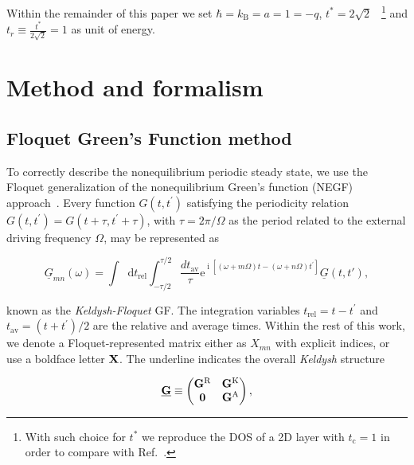 \documentclass[aps,prb,groupedaddress,showpacs,twocolumn,superscriptaddress,10pt]{revtex4-2}
\newcommand{\ee}{\mathrm{e}}  %
\DeclareMathOperator*{\ii}{i} %
\newcommand*\dd{\mathop{}\!\mathrm{d}}
\begin{document}
Within the remainder of this paper we set $\hbar = k_{\text{B}} = a = 1 = -q$, $t^{\ast}=2\sqrt{2}$ ~\footnote{With such choice for $t^{\ast}$ we reproduce the DOS of a 2D layer with $t_{\text{c}}=1$  in order to compare with Ref.~\cite{so.do.18}.} and $t_r \equiv \frac{t^{\ast}}{2\sqrt{2}}=1$ as unit of energy. 

  

\section{Method and formalism}    
\label{sec:Method_formalism}  

\subsection{Floquet Green's Function method}   
\label{sec:GFs_Dyson_Floquet}

To correctly describe the nonequilibrium periodic steady state, we use the Floquet generalization of the nonequilibrium Green's function (NEGF) approach~\cite{ts.ok.08}. Every function $G(t,t^{\prime})$ satisfying the periodicity relation $G(t,t^{\prime})=G(t+\tau,t^{\prime}+\tau)$, with $\tau=2\pi/\Omega$ as the period related to the external driving frequency $\Omega$, may be represented as~\cite{ts.ok.08,sc.mo.02u,jo.fr.08}

\begin{equation}
\label{eq:FloquetGF} 
\underline{G}_{mn}(\omega) =\int \dd t_{\text{rel}} \int_{-\tau/2}^{\tau/2} \frac{dt_{\text{av}}}{\tau} \ee^{\ii[\left(\omega+m\Omega\right) t -\left( \omega+n\Omega\right)t^{\prime}]} \underline{G}(t,t'),
\end{equation}

known as the \emph{Keldysh-Floquet} GF. The integration variables $t_{\text{rel}} = t-t^{\prime}$ and $t_{\text{av}} = (t+t^{\prime})/2$ are the relative and average times. Within the rest of this work, we denote a Floquet-represented matrix either as $X_{mn}$ with explicit indices, or use a boldface letter $\bf{X}$. The underline indicates the overall \emph{Keldysh} structure

\begin{equation}\label{eq:Keld-structure}
\underline{{\bf G}} \equiv 
\begin{pmatrix}
{\bf G}^{\text{R}} & {\bf G}^{\text{K}}\\
{\bf 0}         & {\bf G}^{\text{A}} \\
\end{pmatrix},
\end{equation}
\end{document}
